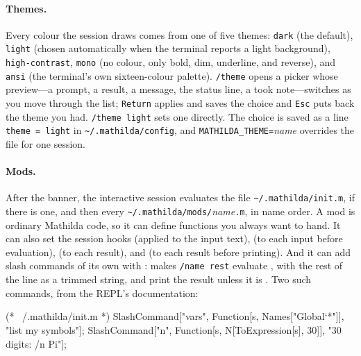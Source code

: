 \paragraph{Themes.} Every colour the session draws comes
from one of five themes: \texttt{dark} (the default), \texttt{light} (chosen
automatically when the terminal reports a light background), \texttt{high-contrast},
\texttt{mono} (no colour, only bold, dim, underline, and reverse), and
\texttt{ansi} (the terminal's own sixteen-colour palette). \texttt{/theme} opens a
picker whose preview---a prompt, a result, a message, the status line, a took
note---switches as you move through the list; \texttt{Return} applies and saves the
choice and \texttt{Esc} puts back the theme you had. \texttt{/theme light} sets one
directly. The choice is saved as a line \texttt{theme = light} in
\texttt{\textasciitilde/.mathilda/config}, and \texttt{MATHILDA\_THEME=}\emph{name} overrides
the file for one session.

\paragraph{Mods.} After the banner, the interactive session
evaluates the file \texttt{\textasciitilde/.mathilda/init.m}, if there is one, and then every
\texttt{\textasciitilde/.mathilda/mods/}\emph{name}\texttt{.m}, in name order. A mod is ordinary
Mathilda code, so it can define functions you always want to hand. It can also set
the session hooks  (applied to the input text),  (to each
input before evaluation),  (to each result), and  (to each
result before printing). And it can add slash commands of its own with
:
 makes \texttt{/name rest} evaluate
, with the rest of the line as a trimmed string, and print the result
unless it is . Two such commands, from the REPL's documentation:

\begin{shell}
(* ~/.mathilda/init.m *)
SlashCommand["vars", Function[s, Names["Global`*"]], "list my symbols"];
SlashCommand["n", Function[s, N[ToExpression[s], 30]], "30 digits: /n Pi"];
\end{shell}

